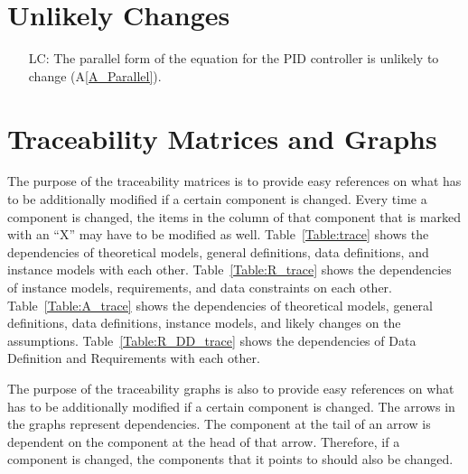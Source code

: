 \documentclass[12pt]{article}
\newcommand{\aref}[1]{A\ref{#1}}
\newcounter{lcnum} %
\begin{document}
\section{Unlikely Changes}    

\noindent \begin{itemize}
 
\item[LC\refstepcounter{lcnum}\thelcnum\label{LC_U_Parallel}:]  The parallel form of the equation for the PID controller is 
    unlikely to change (\aref{A_Parallel}).

\end{itemize}

\section{Traceability Matrices and Graphs}

The purpose of the traceability matrices is to provide easy references on what
has to be additionally modified if a certain component is changed.  Every time a
component is changed, the items in the column of that component that is marked
with an ``X'' may have to be modified as well.  Table~\ref{Table:trace} shows the
dependencies of theoretical models, general definitions, data definitions, and
instance models with each other. Table~\ref{Table:R_trace} shows the
dependencies of instance models, requirements, and data constraints on each
other. Table~\ref{Table:A_trace} shows the dependencies of theoretical models,
general definitions, data definitions, instance models, and likely changes on
the assumptions. Table~\ref{Table:R_DD_trace} shows the dependencies of Data
Definition and Requirements with each other.

The purpose of the traceability graphs is also to provide easy references on
what has to be additionally modified if a certain component is changed.  The
arrows in the graphs represent dependencies. The component at the tail of an
arrow is dependent on the component at the head of that arrow. Therefore, if a
component is changed, the components that it points to should also be
changed. 


\end{document}

